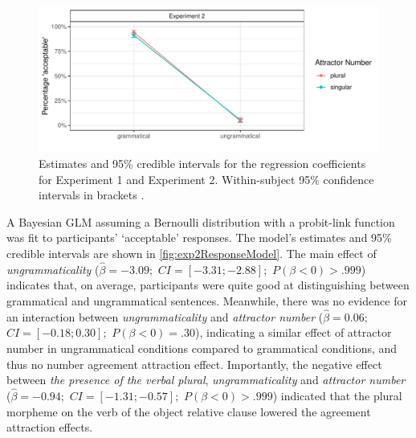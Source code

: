 \documentclass[doc,a4paper,man,natbib,floatsintext,noextraspace]{apa6}\usepackage[]{graphicx}\usepackage[]{color}
\makeatletter
\def\maxwidth{ %
  \ifdim\Gin@nat@width>\linewidth
    \linewidth
  \else
    \Gin@nat@width
  \fi
}
\newenvironment{knitrout}{}{} %
\makeatother
\begin{document}
\begin{knitrout}
\color{fgcolor}\begin{figure}

{\centering \includegraphics[width=\maxwidth]{figure/exp2AvgResponse-1} 

}

\caption{Estimates and 95\% credible intervals for the regression coefficients for Experiment 1 and Experiment 2.  Within-subject 95\% confidence intervals in brackets \cite{Cousineau:2005,Morey:2008}.}\label{fig:exp2AvgResponse}
\end{figure}


\end{knitrout}







A Bayesian GLM assuming a Bernoulli distribution with a probit-link function was fit to participants' `acceptable' responses. The model's estimates and 95\% credible intervals are shown in \autoref{fig:exp2ResponseModel}. 
The main effect of \textit{ungrammaticality} ($\hat{\beta}=-3.09;$ $CI=[-3.31; -2.88];$ $P(\beta<0)> .999$) indicates that, 
on average, participants were quite good at distinguishing between grammatical and ungrammatical sentences. 
Meanwhile, there was no evidence for an interaction between \textit{ungrammaticality} and \textit{attractor number} ($\hat{\beta}=0.06;$ $CI=[-0.18; 0.30];$ $P(\beta<0)=    .30$), indicating 
a similar effect of attractor number in ungrammatical conditions compared to grammatical conditions, and thus no number agreement attraction effect.
Importantly, the negative effect between \textit{the presence of the verbal plural}, \textit{ungrammaticality} and \textit{attractor number} ($\hat{\beta}=-0.94;$ $CI=[-1.31; -0.57];$ $P(\beta<0)> .999$) indicated that the plural morpheme on the verb of the object relative clause lowered the agreement attraction effects.
\end{document}
